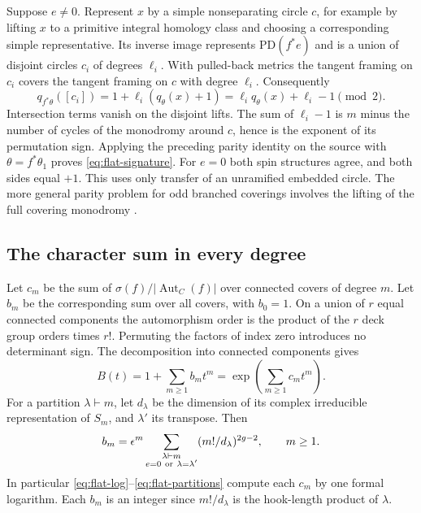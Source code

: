 Suppose \(e\ne0\). Represent \(x\) by a simple nonseparating circle \(c\), for example by lifting \(x\) to a primitive integral homology class and choosing a corresponding simple representative. Its inverse image represents \(\mathrm{PD}(f^*e)\) and is a union of disjoint circles \(c_i\) of degrees \(\ell_i\). With pulled-back metrics the tangent framing on \(c_i\) covers the tangent framing on \(c\) with degree \(\ell_i\). Consequently
\[q_{f^*\theta}([c_i])=1+\ell_i(q_\theta(x)+1)
                =\ell_i q_\theta(x)+\ell_i-1\pmod2.\]
Intersection terms vanish on the disjoint lifts. The sum of \(\ell_i-1\) is \(m\) minus the number of cycles of the monodromy around \(c\), hence is the exponent of its permutation sign. Applying the preceding parity identity on the source with \(\theta=f^*\theta_1\) proves \eqref{eq:flat-signature}. For \(e=0\) both spin structures agree, and both sides equal \(+1\). This uses only transfer of an unramified embedded circle. The more general parity problem for odd branched coverings involves the lifting of the full covering monodromy \cite{eop}.

\subsection{The character sum in every degree}

Let \(c_m\) be the sum of \(\sigma(f)/|\operatorname{Aut}_C(f)|\) over connected covers of degree \(m\). Let \(b_m\) be the corresponding sum over all covers, with \(b_0=1\). On a union of \(r\) equal connected components the automorphism order is the product of the \(r\) deck group orders times \(r!\). Permuting the factors of index zero introduces no determinant sign. The decomposition into connected components gives
\begin{equation}
B(t)=1+\sum_{m\ge1} b_m t^m
       =\exp\left(\sum_{m\ge1} c_m t^m\right).
 \label{eq:flat-log}
\end{equation}
For a partition \(\lambda\vdash m\), let \(d_\lambda\) be the dimension of its complex irreducible representation of \(S_m\), and \(\lambda'\) its transpose. Then
\begin{equation}
b_m=\epsilon^m
  \sum_{\substack{\lambda\vdash m\\e=0\ {\rm or}\ \lambda=\lambda'}}
            (m!/d_\lambda)^{2g-2},\qquad m\ge1 .
 \label{eq:flat-partitions}
\end{equation}
In particular \eqref{eq:flat-log}--\eqref{eq:flat-partitions} compute each \(c_m\) by one formal logarithm. Each \(b_m\) is an integer since \(m!/d_\lambda\) is the hook-length product of \(\lambda\).

